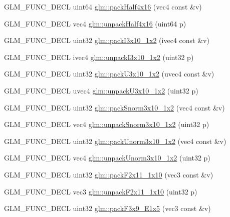 \begin{DoxyCompactItemize}
G\+L\+M\+\_\+\+F\+U\+N\+C\+\_\+\+D\+E\+CL uint64 \hyperlink{group__gtc__packing_ga8104f0b719b7792491f2b789a6dd6f96}{glm\+::pack\+Half4x16} (vec4 const \&v)
\item 
G\+L\+M\+\_\+\+F\+U\+N\+C\+\_\+\+D\+E\+CL vec4 \hyperlink{group__gtc__packing_gaea526d6491ad40401eac34803984bf27}{glm\+::unpack\+Half4x16} (uint64 p)
\item 
G\+L\+M\+\_\+\+F\+U\+N\+C\+\_\+\+D\+E\+CL uint32 \hyperlink{group__gtc__packing_ga032e18fa5bc5b8f3897104aeb2f1e195}{glm\+::pack\+I3x10\+\_\+1x2} (ivec4 const \&v)
\item 
G\+L\+M\+\_\+\+F\+U\+N\+C\+\_\+\+D\+E\+CL ivec4 \hyperlink{group__gtc__packing_ga08bcd34cf9c34701d658dd861ee6e300}{glm\+::unpack\+I3x10\+\_\+1x2} (uint32 p)
\item 
G\+L\+M\+\_\+\+F\+U\+N\+C\+\_\+\+D\+E\+CL uint32 \hyperlink{group__gtc__packing_gaf656d8862628f96b20de7a36eaa1fe56}{glm\+::pack\+U3x10\+\_\+1x2} (uvec4 const \&v)
\item 
G\+L\+M\+\_\+\+F\+U\+N\+C\+\_\+\+D\+E\+CL uvec4 \hyperlink{group__gtc__packing_ga119aa2d7d55952f9dc4214390a6ffefc}{glm\+::unpack\+U3x10\+\_\+1x2} (uint32 p)
\item 
G\+L\+M\+\_\+\+F\+U\+N\+C\+\_\+\+D\+E\+CL uint32 \hyperlink{group__gtc__packing_ga0d4157cec37c0312216a7be1cc92df54}{glm\+::pack\+Snorm3x10\+\_\+1x2} (vec4 const \&v)
\item 
G\+L\+M\+\_\+\+F\+U\+N\+C\+\_\+\+D\+E\+CL vec4 \hyperlink{group__gtc__packing_ga8b8bb827a3743ca553d8702d3e337101}{glm\+::unpack\+Snorm3x10\+\_\+1x2} (uint32 p)
\item 
G\+L\+M\+\_\+\+F\+U\+N\+C\+\_\+\+D\+E\+CL uint32 \hyperlink{group__gtc__packing_ga2cf2d11b40bd48639110456fd74c2e33}{glm\+::pack\+Unorm3x10\+\_\+1x2} (vec4 const \&v)
\item 
G\+L\+M\+\_\+\+F\+U\+N\+C\+\_\+\+D\+E\+CL vec4 \hyperlink{group__gtc__packing_gaf69ace2b5e9234f8afb4e99c3df1193d}{glm\+::unpack\+Unorm3x10\+\_\+1x2} (uint32 p)
\item 
G\+L\+M\+\_\+\+F\+U\+N\+C\+\_\+\+D\+E\+CL uint32 \hyperlink{group__gtc__packing_ga8c2a0eeee677ca4dafd9e093d9e81062}{glm\+::pack\+F2x11\+\_\+1x10} (vec3 const \&v)
\item 
G\+L\+M\+\_\+\+F\+U\+N\+C\+\_\+\+D\+E\+CL vec3 \hyperlink{group__gtc__packing_ga8b9c7991eb021d95c778bf5c0b2f7824}{glm\+::unpack\+F2x11\+\_\+1x10} (uint32 p)
\item 
G\+L\+M\+\_\+\+F\+U\+N\+C\+\_\+\+D\+E\+CL uint32 \hyperlink{group__gtc__packing_ga0984f9598edc648d59a9643d9a61b121}{glm\+::pack\+F3x9\+\_\+\+E1x5} (vec3 const \&v)

\end{DoxyCompactItemize}
